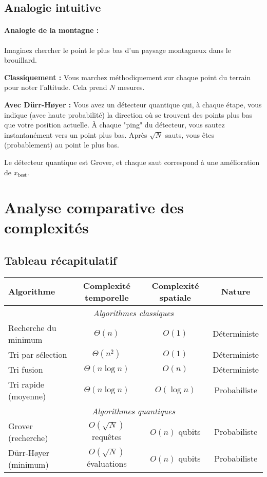 \documentclass[12pt,a4paper]{article}
\theoremstyle{definition}
\theoremstyle{remark}
\begin{document}
\subsection{Analogie intuitive}

\paragraph{Analogie de la montagne :}
Imaginez chercher le point le plus bas d'un paysage montagneux dans le brouillard.

\textbf{Classiquement :} Vous marchez méthodiquement sur chaque point du terrain pour noter l'altitude. Cela prend $N$ mesures.

\textbf{Avec Dürr-Høyer :} Vous avez un détecteur quantique qui, à chaque étape, vous indique (avec haute probabilité) la direction où se trouvent des points plus bas que votre position actuelle. À chaque "ping" du détecteur, vous sautez instantanément vers un point plus bas. Après $\sqrt{N}$ sauts, vous êtes (probablement) au point le plus bas.

Le détecteur quantique est Grover, et chaque saut correspond à une amélioration de $x_{\text{best}}$.

\newpage

\section{Analyse comparative des complexités}

\subsection{Tableau récapitulatif}

\begin{center}
\begin{tabular}{|l|c|c|c|}
\hline
\textbf{Algorithme} & \textbf{Complexité temporelle} & \textbf{Complexité spatiale} & \textbf{Nature} \\
\hline
\hline
\multicolumn{4}{|c|}{\textit{Algorithmes classiques}} \\
\hline
Recherche du minimum & $\Theta(n)$ & $O(1)$ & Déterministe \\
Tri par sélection & $\Theta(n^2)$ & $O(1)$ & Déterministe \\
Tri fusion & $\Theta(n \log n)$ & $O(n)$ & Déterministe \\
Tri rapide (moyenne) & $\Theta(n \log n)$ & $O(\log n)$ & Probabiliste \\
\hline
\hline
\multicolumn{4}{|c|}{\textit{Algorithmes quantiques}} \\
\hline
Grover (recherche) & $O(\sqrt{N})$ requêtes & $O(n)$ qubits & Probabiliste \\
Dürr-Høyer (minimum) & $O(\sqrt{N})$ évaluations & $O(n)$ qubits & Probabiliste \\
\hline
\end{tabular}
\end{center}
\end{document}
